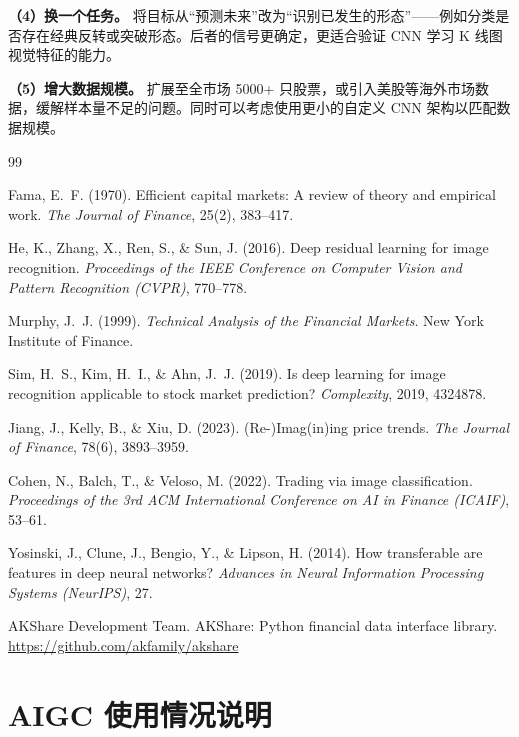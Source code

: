 \documentclass[12pt,a4paper]{ctexart}
\begin{document}
\textbf{（4）换一个任务。} 将目标从``预测未来''改为``识别已发生的形态''——例如分类是否存在经典反转或突破形态。后者的信号更确定，更适合验证 CNN 学习 K 线图视觉特征的能力。

\textbf{（5）增大数据规模。} 扩展至全市场 5000+ 只股票，或引入美股等海外市场数据，缓解样本量不足的问题。同时可以考虑使用更小的自定义 CNN 架构以匹配数据规模。

\begin{thebibliography}{99}

Fama, E.~F. (1970).
Efficient capital markets: A review of theory and empirical work.
\textit{The Journal of Finance}, 25(2), 383--417.

He, K., Zhang, X., Ren, S., \& Sun, J. (2016).
Deep residual learning for image recognition.
\textit{Proceedings of the IEEE Conference on Computer Vision and Pattern Recognition (CVPR)}, 770--778.

Murphy, J.~J. (1999).
\textit{Technical Analysis of the Financial Markets}.
New York Institute of Finance.

Sim, H.~S., Kim, H.~I., \& Ahn, J.~J. (2019).
Is deep learning for image recognition applicable to stock market prediction?
\textit{Complexity}, 2019, 4324878.

Jiang, J., Kelly, B., \& Xiu, D. (2023).
(Re-)Imag(in)ing price trends.
\textit{The Journal of Finance}, 78(6), 3893--3959.

Cohen, N., Balch, T., \& Veloso, M. (2022).
Trading via image classification.
\textit{Proceedings of the 3rd ACM International Conference on AI in Finance (ICAIF)}, 53--61.

Yosinski, J., Clune, J., Bengio, Y., \& Lipson, H. (2014).
How transferable are features in deep neural networks?
\textit{Advances in Neural Information Processing Systems (NeurIPS)}, 27.

AKShare Development Team.
AKShare: Python financial data interface library.
\url{https://github.com/akfamily/akshare}

\end{thebibliography}

\section*{AIGC 使用情况说明}
\end{document}
